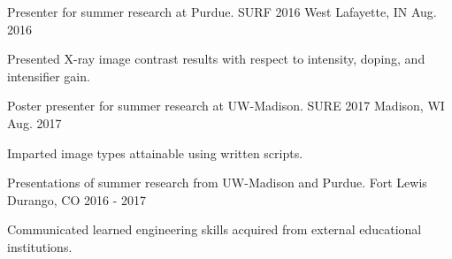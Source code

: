 \begin{cventries}
  \cventry
    {Presenter for summer research at Purdue.}
    {SURF 2016}
    {West Lafayette, IN}
    {Aug. 2016}
    {
      \begin{cvitems}
        \item {Presented X-ray image contrast results with respect to intensity, doping, and intensifier gain.}
      \end{cvitems}
    }
    
  \cventry
    {Poster presenter for summer research at UW-Madison.}
    {SURE 2017}
    {Madison, WI}
    {Aug. 2017}
    {
      \begin{cvitems}
        \item {Imparted image types attainable using written scripts.}
      \end{cvitems}
    }
    
  \cventry
    {Presentations of summer research from UW-Madison and Purdue.}
    {Fort Lewis}
    {Durango, CO}
    {2016 - 2017}
    {
      \begin{cvitems}
        \item {Communicated learned engineering skills acquired from external educational institutions.}
      \end{cvitems}
    }
\end{cventries}
